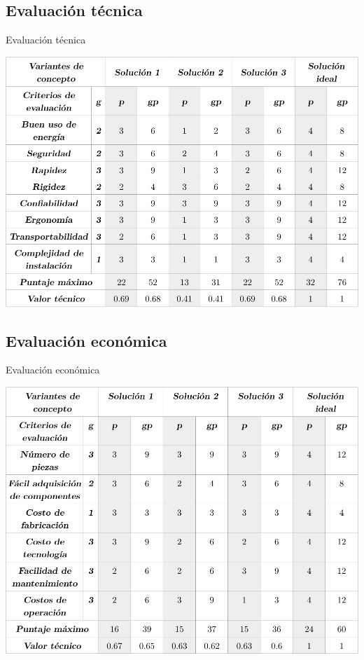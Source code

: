 \subsection{Evaluación técnica}
\begin{table}[htbp!]
  \centering
  \caption{Evaluación técnica}
  \label{diag:eval_tec}
  \includegraphics[width=0.95\linewidth]{eval_tec.pdf}
\end{table}

\newpage

\subsection{Evaluación económica}
\begin{table}[htbp!]
  \centering
  \caption{Evaluación económica}
  \label{diag:eval_econ}
  \includegraphics[width=0.95\linewidth]{eval_econ.pdf}
\end{table}

